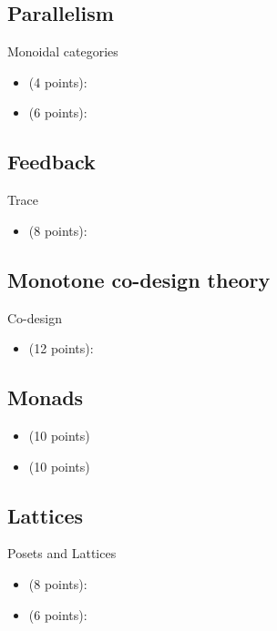 \subsection{Parallelism}

Monoidal categories
\begin{itemize}
    \item {} (4 points): 
    \item {} (6 points): 
\end{itemize}

\subsection{Feedback}

Trace
\begin{itemize}
    \item {} (8 points): 
\end{itemize}

\subsection{Monotone co-design theory}

Co-design

\begin{itemize}
    \item {} (12 points): 
\end{itemize}

\subsection{Monads}

\begin{itemize}
    \item {} (10 points)  
    \item {} (10 points) 
\end{itemize}

\subsection{Lattices}

Posets and Lattices
\begin{itemize}
    \item {} (8 points): 
    \item {} (6 points):  
\end{itemize}

